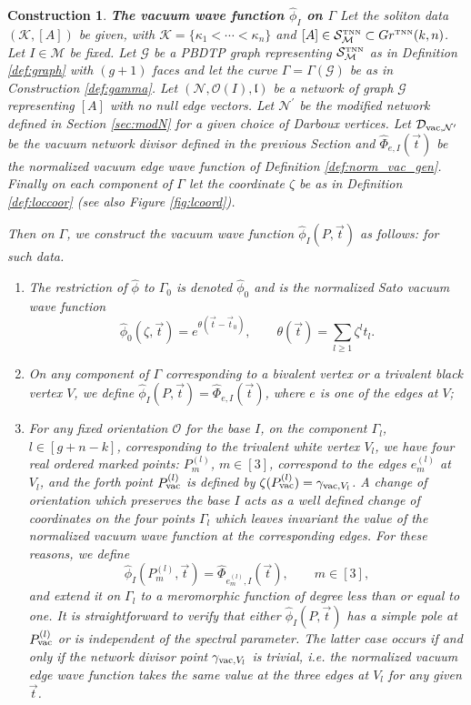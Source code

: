\documentclass[11pt]{amsart}
\theoremstyle{plain}
\numberwithin{equation}{section}
\newtheorem{construction}{Construction}[subsection]
\def \GTNN {{Gr^{\mbox{\tiny TNN}} (k,n)}}
\def \DVN {{\mathcal D}_{\textup{\scriptsize vac},{\mathcal N}^{\prime}}}
\def \S {{\mathcal S}_{\mathcal M}^{\mbox{\tiny TNN}}}
\begin{document}
\begin{construction}\label{con:vac_gen}\textbf{The vacuum wave function $\hat \phi_I$ on $\Gamma$}
Let the soliton data $({\mathcal K}, [A])$ be given, with $\mathcal K = \{ \kappa_1 < \cdots < \kappa_n\}$ and $[A]\in \S \subset \GTNN$. Let $I\in \mathcal M$ be fixed.
Let $\mathcal G$ be a PBDTP graph representing $\S$ as in Definition \ref{def:graph} with $(g+1)$ faces and let the curve $\Gamma=\Gamma(\mathcal G)$ be as in Construction \ref{def:gamma}. 
Let $({\mathcal N}, \mathcal O(I), \mathfrak l)$ be a network of graph $\mathcal G$ representing $[A]$ with no null edge vectors. Let ${\mathcal N}^{\prime}$ be the modified network defined in Section \ref{sec:modN} for a given choice of Darboux vertices. Let $\DVN$ be the vacuum network divisor defined in the previous Section and $\hat \Phi_{e,I} (\vec t)
$ be the normalized vacuum edge wave function of Definition \ref{def:norm_vac_gen}. Finally on each component of $\Gamma$ let the coordinate $\zeta$ be as in Definition \ref{def:loccoor} (see also Figure \ref{fig:lcoord}).

Then on $\Gamma$, we construct the vacuum wave function $\hat \phi_I(P, \vec t)$ as follows:
for such data. 
\begin{enumerate}
\item The restriction of ${\hat \phi}$ to $\Gamma_{0}$ is denoted ${\hat \phi}_0$ and is the normalized  Sato vacuum wave function 
\[
{\hat \phi}_0 (\zeta, \vec t) = e^{\theta (\vec t-\vec t_0)},\quad\quad 	\theta(\vec t) = \sum\limits_{l\ge 1} \zeta^l t_l.
\]
\item On any component of $\Gamma$ corresponding to a bivalent vertex or a trivalent black vertex $V$, we define $\hat \phi_I (P, \vec t) = \hat \Phi_{e,I} (\vec t)$, where $e$ is one of the edges at $V$;
\item For any fixed orientation $\mathcal O$ for the base $I$, on the component $\Gamma_l$, $l\in [g+n-k]$, corresponding to the trivalent white vertex $V_l$, we have four real ordered marked points: $P_m^{(l)}$, $m\in [3]$, correspond to the edges $e_m^{(l)}$ at $V_l$, and the forth 
point  $P_{\textup{\scriptsize vac}}^{(l)}$ is defined by $\zeta(P_{\textup{\scriptsize vac}}^{(l)})=\gamma_{\textup{\scriptsize vac}, V_l}$. A change of orientation which preserves the base $I$ acts as a well defined change of coordinates on the four points $\Gamma_l$ which leaves invariant the value of the normalized vacuum wave function at the corresponding edges. For these reasons, we define 
\[
\hat \phi_I (P_m^{(l)}, \vec t) = \hat \Phi_{e_m^{(l)},I} (\vec t),\quad\quad m\in [3],
\]
and extend it on $\Gamma_l$ to a meromorphic function of degree less than or equal to one. It is straightforward to verify that
either $\hat \phi_I (P, \vec t)$ has a simple pole at $P_{\textup{\scriptsize vac}}^{(l)}$ or is independent of the spectral parameter. The latter case occurs if and only if the network divisor point $\gamma_{\textup{\scriptsize vac}, V_l}$ is trivial, {\sl i.e.} the normalized vacuum edge wave function takes the same value at the three edges at $V_l$ for any given $\vec t$.
\end{enumerate}
\end{construction}
\end{document}
